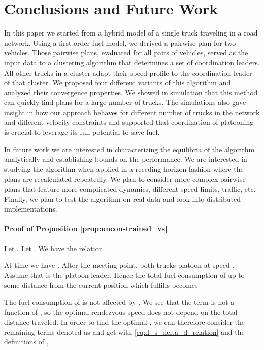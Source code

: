\documentclass[letterpaper,10pt,conference,twocolumn]{IEEEtran}
\theoremstyle{definition}
\begin{document}
\section{Conclusions and Future Work}

In this paper we started from a hybrid model of a single truck traveling in a road network. Using a first order fuel model, we derived a pairwise plan for two vehicles. Those pairwise plans, evaluated for all pairs of vehicles, served as the input data to a clustering algorithm that determines a set of coordination leaders. All other trucks in a cluster adapt their speed profile to the coordination leader of that cluster. We proposed four different variants of this algorithm and analyzed their convergence properties. We showed in simulation that this method can quickly find plans for a large number of trucks. The simulations also gave insight in how our approach behaves for different number of trucks in the network and different velocity constraints and supported that coordination of platooning is crucial to leverage its full potential to save fuel.

In future work we are interested in characterizing the equilibria of the algorithm analytically and establishing bounds on the performance. We are interested in studying the algorithm when applied in a receding horizon fashion where the plans are recalculated repeatedly. We plan to consider more complex pairwise plans that feature more complicated dynamics, different speed limits, traffic, etc. Finally, we plan to test the algorithm on real data and look into distributed implementations.

\appendix 

\paragraph*{Proof of Proposition \ref{prop:unconstrained_vs}}

Let . Let . 
We have the relation

At time  we have . After the meeting point, both trucks platoon at speed . Assume that  is the platoon leader. Hence the total fuel consumption of  up to some distance from the current position  which fulfills  becomes

The fuel consumption of  is not affected by . We see that the term  is not a function of , so the optimal rendezvous speed does not depend on the total distance traveled. In order to find the optimal , we can therefore consider the remaining terms denoted as  and get with \eqref{eq:d_s_delta_d_relation} and the definitions of , 
\end{document}
